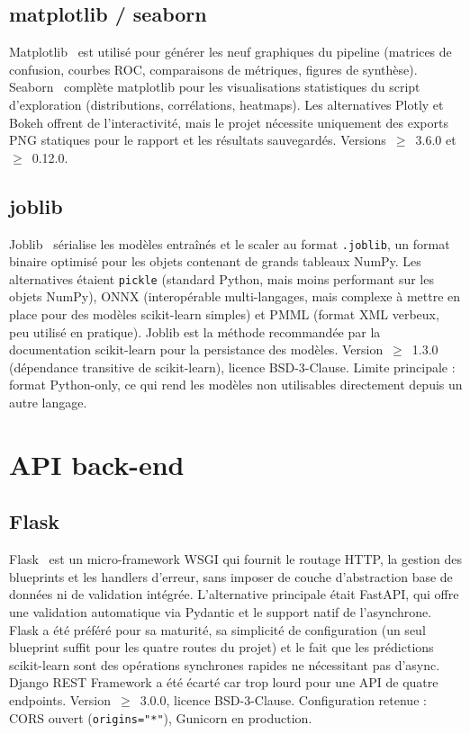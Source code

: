 \documentclass[12pt,a4paper,openany]{report}
\begin{document}
\subsection{matplotlib / seaborn}

Matplotlib~\cite{matplotlib} est utilisé pour générer les neuf graphiques du pipeline (matrices de confusion, courbes ROC, comparaisons de métriques, figures de synthèse). Seaborn~\cite{seaborn} complète matplotlib pour les visualisations statistiques du script d'exploration (distributions, corrélations, heatmaps). Les alternatives Plotly et Bokeh offrent de l'interactivité, mais le projet nécessite uniquement des exports PNG statiques pour le rapport et les résultats sauvegardés. Versions~$\geq$~3.6.0 et $\geq$~0.12.0.

\subsection{joblib}

Joblib~\cite{joblib} sérialise les modèles entraînés et le scaler au format \texttt{.joblib}, un format binaire optimisé pour les objets contenant de grands tableaux NumPy. Les alternatives étaient \texttt{pickle} (standard Python, mais moins performant sur les objets NumPy), ONNX (interopérable multi-langages, mais complexe à mettre en place pour des modèles scikit-learn simples) et PMML (format XML verbeux, peu utilisé en pratique). Joblib est la méthode recommandée par la documentation scikit-learn pour la persistance des modèles. Version~$\geq$~1.3.0 (dépendance transitive de scikit-learn), licence BSD-3-Clause. Limite principale : format Python-only, ce qui rend les modèles non utilisables directement depuis un autre langage.

\section{API back-end}

\subsection{Flask}
Flask~\cite{flask} est un micro-framework WSGI qui fournit le routage HTTP, la gestion des blueprints et les handlers d'erreur, sans imposer de couche d'abstraction base de données ni de validation intégrée. L'alternative principale était FastAPI, qui offre une validation automatique via Pydantic et le support natif de l'asynchrone. Flask a été préféré pour sa maturité, sa simplicité de configuration (un seul blueprint suffit pour les quatre routes du projet) et le fait que les prédictions scikit-learn sont des opérations synchrones rapides ne nécessitant pas d'async. Django REST Framework a été écarté car trop lourd pour une API de quatre endpoints. Version~$\geq$~3.0.0, licence BSD-3-Clause. Configuration retenue : CORS ouvert (\texttt{origins="*"}), Gunicorn en production.
\end{document}
